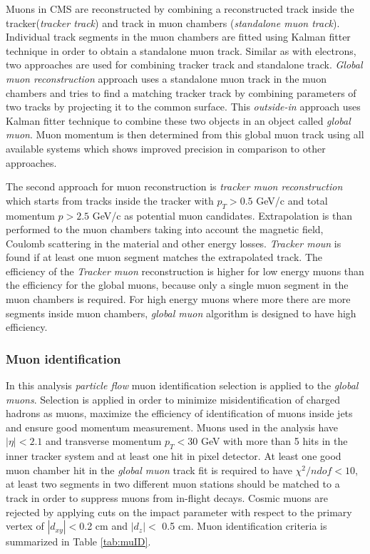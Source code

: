 Muons in CMS are reconstructed by combining a reconstructed track inside the tracker(\textit{tracker track}) and track in muon chambers (\textit{standalone muon track}). Individual track segments in the muon chambers are fitted using Kalman fitter technique \cite{Fruhwirth1987444}  in order to obtain a standalone muon track. Similar as with electrons, two approaches are used for combining tracker track and standalone track. \textit{Global muon reconstruction} approach uses a standalone muon track in the muon chambers and tries to find a matching tracker track by combining parameters of two tracks by projecting it to the common surface. This \textit{outside-in} approach uses Kalman fitter technique to combine these two objects in an object called \textit{global muon}. Muon momentum is then determined from this global muon track using all available systems which shows improved precision in comparison to other approaches.  
\par The second approach for muon reconstruction is \textit{tracker muon reconstruction} which starts from tracks inside the tracker with $p_T>0.5$ GeV/c and total momentum $p>2.5$ GeV/c as potential muon candidates. Extrapolation is than performed to the muon chambers taking into account the magnetic field, Coulomb scattering in the material and other energy losses. \textit{Tracker moun} is found if at least one muon segment matches the extrapolated track. The efficiency of the \textit{Tracker muon} reconstruction is higher for low energy muons than the efficiency for the global muons, because only a single muon segment in the muon chambers is required. For high energy muons where more there are more segments inside muon chambers, \textit{global muon} algorithm is designed to have high efficiency.    


\subsubsection*{Muon identification}
\label{sec:muID}

In this analysis \textit{particle flow} muon identification selection is applied to the \textit{global muons}. Selection is applied in order to minimize misidentification of charged hadrons as muons, maximize the efficiency of identification of muons inside jets and ensure good momentum measurement. Muons used in the analysis have $|\eta|<2.1$ and transverse momentum $p_T<30$ GeV with more than 5 hits in the inner tracker system and at least one hit in pixel detector. At least one good muon chamber hit in the \textit{global muon} track fit is required to have $\chi^2/ndof<10$, at least two segments in two different muon stations should be matched to a track in order to suppress muons from in-flight decays. Cosmic muons are rejected by applying cuts on the impact parameter with respect to the primary vertex of $|d_{xy}|<$0.2 cm and $|d_z|<$ 0.5 cm. Muon identification criteria is summarized in Table \ref{tab:muID}.

